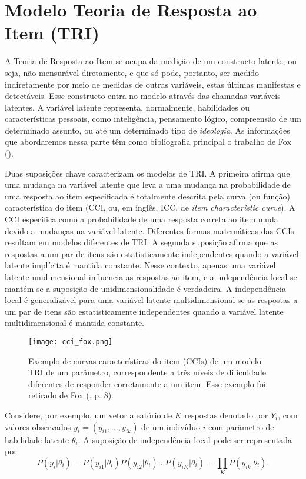 \documentclass[
	12pt,				%
	openright,			%
	twoside,			%
	a4paper,			%
	english,			%
	brazil				%
	]{abntex2}
\begin{document}
 \section{Modelo Teoria de Resposta ao Item (TRI)}
 A Teoria de Resposta ao Item se ocupa da medição de um constructo latente, ou seja, não mensurável diretamente, e que só pode, portanto, ser medido indiretamente por meio de medidas de outras variáveis, estas últimas manifestas e detectáveis. Esse constructo entra no modelo através das chamadas variáveis latentes. A variável latente representa, normalmente, habilidades ou características pessoais, como inteligência, pensamento lógico, compreensão de um determinado assunto, ou até um determinado tipo de \emph{ideologia}. As informações que abordaremos nessa parte têm como bibliografia principal o trabalho de Fox (\citeyear{fox2010}).

 Duas suposições chave caracterizam os modelos de TRI. A primeira afirma que uma mudança na variável latente que leva a uma mudança na probabilidade de uma resposta ao item especificada é totalmente descrita pela curva (ou função) característica do item (CCI, ou, em inglês, ICC, de \emph{item characteristic curve}). A CCI especifica como a probabilidade de uma resposta correta ao item muda devido a mudanças na variável latente. Diferentes formas matemáticas das CCIs resultam em modelos diferentes de TRI. A segunda suposição afirma que as respostas a um par de itens são estatisticamente independentes quando a variável latente implícita é mantida constante. Nesse contexto, apenas uma variável latente unidimensional influencia as respostas ao item, e a independência local se mantém se a suposição de unidimensionalidade é verdadeira. A independência local é generalizável para uma variável latente multidimensional se as respostas a um par de itens são estatisticamente independentes quando a variável latente multidimensional é mantida constante.

 \begin{figure}[!htbp]
    \centering
    \texttt{[image: cci\_fox.png]}
    \caption{Exemplo de curvas características do item (CCIs) de um modelo TRI de um parâmetro, correspondente a três níveis de dificuldade diferentes de responder corretamente a um item. Esse exemplo foi retirado de Fox (\citeyear{fox2010}, p. 8).}
    \label{fig:cci}
 \end{figure}

 Considere, por exemplo, um vetor aleatório de $K$ respostas denotado por $Y_{i}$, com valores observados $y_{i} = (y_{i1}, ... , y_{ik})$ de um indivíduo $i$ com parâmetro de habilidade latente $\theta_{i}$. A suposição de independência local pode ser representada por
 \begin{equation}
    P(y_{i}|\theta_{i}) = P(y_{i1}|\theta_{i}) P(y_{i2}|\theta_{i}) ... P(y_{iK}|\theta_{i}) = \prod_{K}{P(y_{ik}|\theta_{i})}.\label{eq:indlocal}
  \end{equation}
  
\end{document}
